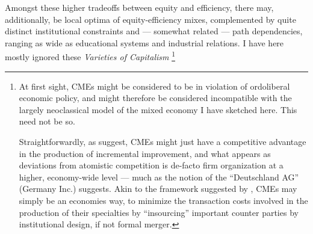 \documentclass[11pt,a4paper,oneside,openright]{article}
\begin{document}
\begin{enumerate}
	Amongst these higher tradeoffs between equity and efficiency, there may, additionally, be local optima of equity-efficiency mixes, complemented by quite distinct institutional constraints and --- somewhat related --- path dependencies, ranging as wide as educational systems and industrial relations. I have here mostly ignored these \emph{Varieties of Capitalism} \citep{HallSoskice-2001-aa}\footnote{
		At first sight, \glspl{CME} might be considered to be in violation of ordoliberal economic policy, and might therefore be considered incompatible with the largely neoclassical model of the mixed economy I have sketched here. This need not be so. 
		
		Straightforwardly, as \citeauthor{HallSoskice-2001-aa} suggest, \glspl{CME} might just have a competitive advantage in the production of incremental improvement, and what appears as deviations from atomistic competition is de-facto firm organization at a higher, economy-wide level --- much as the notion of the ``Deutschland AG'' (Germany Inc.) suggests. Akin to the framework suggested by \cite{Hart1990}, \glspl{CME} may simply be an economies way, to minimize the transaction costs involved in the production of their specialties by ``insourcing'' important counter parties by institutional design, if not formal merger. 
		
}
\end{enumerate}
\end{document}
